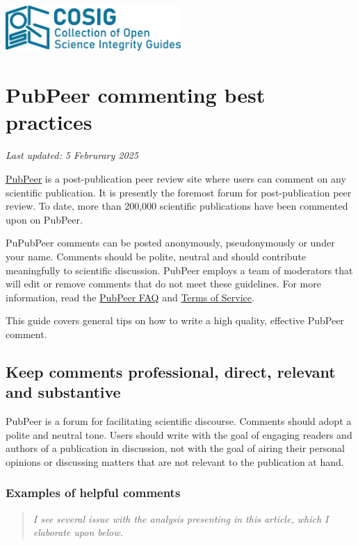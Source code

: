 \documentclass[letterpaper, 12pt]{article}
\begin{document}
\flushleft
\includegraphics[width=0.5\textwidth]{img/home/241017_final_logo_mockup.png}

\section*{PubPeer commenting best practices}
\textit{Last updated: 5 Februrary 2025}

\href{https://pubpeer.com/}{PubPeer} is a post-publication peer review site where users can comment on any scientific publication. It is presently the foremost forum for post-publication peer review. To date, more than 200,000 scientific publications have been commented upon on PubPeer.

PuPubPeer comments can be posted anonymously, pseudonymously or under your name. Comments should be polite, neutral and should contribute meaningfully to scientific discussion. PubPeer employs a team of moderators that will edit or remove comments that do not meet these guidelines. For more information, read the \href{https://pubpeer.com/static/faq}{PubPeer FAQ} and \href{https://pubpeer.com/static/tos}{Terms of Service}.

This guide covers general tips on how to write a high quality, effective PubPeer comment.

\subsection*{Keep comments professional, direct, relevant and substantive}

PubPeer is a forum for facilitating scientific discourse. Comments should adopt a polite and neutral tone. Users should write with the goal of engaging readers and authors of a publication in discussion, not with the goal of airing their personal opinions or discussing matters that are not relevant to the publication at hand.

\subsubsection*{Examples of helpful comments}

\begin{quote}
    \textit{I see several issue with the analysis presenting in this article, which I elaborate upon below.}
\end{quote}
\end{document}
